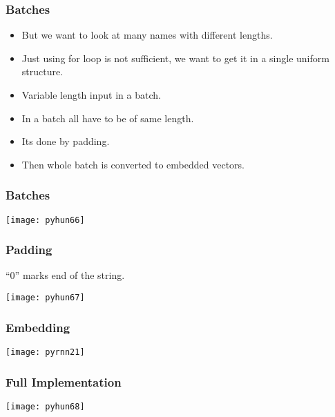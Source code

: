 \begin{frame}[fragile] \frametitle{Batches}
\begin{itemize}
\item But we want to look at many names with different lengths. 
\item Just using for loop is not sufficient, we want to get it in a single uniform structure.
\item Variable length input in a batch.
\item In a batch all have to be of same length.
\item Its done by padding.
\item Then whole batch is converted to embedded vectors.
\end{itemize}
\end{frame}


\begin{frame}[fragile] \frametitle{Batches}
\begin{center}
\texttt{[image: pyhun66]}
\end{center}
\end{frame}

\begin{frame}[fragile] \frametitle{Padding}
``0'' marks end of the string.

\begin{center}
\texttt{[image: pyhun67]}
\end{center}
\end{frame}

\begin{frame}[fragile] \frametitle{Embedding}
\begin{center}
\texttt{[image: pyrnn21]}
\end{center}
\end{frame}



\begin{frame}[fragile] \frametitle{Full Implementation}
\begin{center}
\texttt{[image: pyhun68]}
\end{center}
\end{frame}

